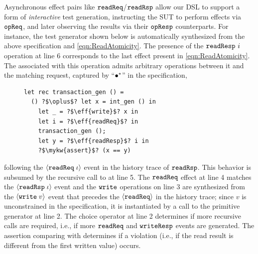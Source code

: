 Asynchronous effect pairs like $\boldsymbol{{\tt readReq}}$/$\boldsymbol{{\tt readRsp}}$ allow
our DSL to support a form of \emph{interactive} test generation,
instructing the SUT to perform effects via $\boldsymbol{{\tt opReq}}$, and later
observing the results via their $\boldsymbol{{\tt opResp}}$ counterparts.  For
instance, the test generator shown below is automatically
synthesized from the above \tyName{} specification and
\ref{eqn:ReadAtomicity}. 
The presence of the $\boldsymbol{{\tt readResp}}~i$
operation at line 6 corresponds to the last effect present in
\ref{eqn:ReadAtomicity}.  
The \tyName{} associated with this operation
admits arbitrary operations between it and the matching request,
captured by ``${\bullet^*}$'' in the specification, 
\begin{figure}
  \vspace{-10pt}
  \begin{verbatim}
let rec transaction_gen () =
  () ?$\oplus$? let x = int_gen () in
    let _ = ?$\eff{write}$? x in
    let i = ?$\eff{readReq}$? in
    transaction_gen ();
    let y = ?$\eff{readResp}$? i in
    ?$\mykw{assert}$? (x == y)
  \end{verbatim}
  \vspace{-10pt}
\end{figure}
following the
${\langle} {\boldsymbol{{\tt readReq}}\;{\iota}} {\rangle}$ event in the history trace of $\boldsymbol{{\tt readRsp}}$.
This behavior is subsumed by the recursive call to
 at line 5. 
The $\boldsymbol{{\tt readReq}}$ effect at line
4 matches the ${\langle} {\boldsymbol{{\tt readRsp}}\;{\iota}} {\rangle}$ event and the $\boldsymbol{{\tt write}}$
operations on line 3 are synthesized from the ${\langle} {\boldsymbol{{\tt write}}\;{v}} {\rangle}$ event
that precedes the $\mbox{$\langle\boldsymbol{{\tt readReq}}\rangle$}$ in the history trace; since $v$
is unconstrained in the specification, it is instantiated by a call
to the  primitive generator at line 2.  The
choice operator at line 2 determines if more recursive calls are
required, i.e., if more $\boldsymbol{{\tt readReq}}$ and $\boldsymbol{{\tt writeResp}}$ events
are generated.  The assertion comparing  with 
determines if a violation (i.e., if the read result is different from
the first written value) occurs.

